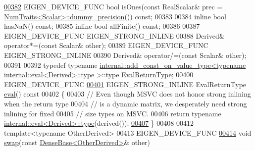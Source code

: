 \begin{DoxyCode}
\hyperlink{group___core___module_a8594e26025b86a531561a2476400eed1}{00382}     EIGEN\_DEVICE\_FUNC \textcolor{keywordtype}{bool} isOnes(\textcolor{keyword}{const} RealScalar& prec = 
      \hyperlink{group___core___module_struct_eigen_1_1_num_traits}{NumTraits<Scalar>::dummy\_precision}()) \textcolor{keyword}{const};
00383     
00384     \textcolor{keyword}{inline} \textcolor{keywordtype}{bool} hasNaN() \textcolor{keyword}{const};
00385     \textcolor{keyword}{inline} \textcolor{keywordtype}{bool} allFinite() \textcolor{keyword}{const};
00386 
00387     EIGEN\_DEVICE\_FUNC EIGEN\_STRONG\_INLINE
00388     Derived& operator*=(\textcolor{keyword}{const} Scalar& other);
00389     EIGEN\_DEVICE\_FUNC EIGEN\_STRONG\_INLINE
00390     Derived& operator/=(\textcolor{keyword}{const} Scalar& other);
00391 
00392     \textcolor{keyword}{typedef} \textcolor{keyword}{typename} 
      \hyperlink{struct_eigen_1_1internal_1_1add__const__on__value__type}{internal::add\_const\_on\_value\_type<typename internal::eval<Derived>::type}
      >::type \hyperlink{group___sparse_core___module}{EvalReturnType};
00400     EIGEN\_DEVICE\_FUNC
\hyperlink{group___core___module_a5df64c66228ba75bbc66db2584185527}{00401}     EIGEN\_STRONG\_INLINE EvalReturnType \hyperlink{group___core___module_a5df64c66228ba75bbc66db2584185527}{eval}()\textcolor{keyword}{ const}
00402 \textcolor{keyword}{    }\{
00403       \textcolor{comment}{// Even though MSVC does not honor strong inlining when the return type}
00404       \textcolor{comment}{// is a dynamic matrix, we desperately need strong inlining for fixed}
00405       \textcolor{comment}{// size types on MSVC.}
00406       \textcolor{keywordflow}{return} \textcolor{keyword}{typename} \hyperlink{struct_eigen_1_1internal_1_1eval}{internal::eval<Derived>::type}(derived());
\hyperlink{group___core___module_a4ce80c44ce2092f18ddecdaaac71b3d0}{00407}     \}
00408     
00412     \textcolor{keyword}{template}<\textcolor{keyword}{typename} OtherDerived>
00413     EIGEN\_DEVICE\_FUNC
\hyperlink{group___core___module_ab420d9d588ac443f5a1b1a7dceb12c90}{00414}     \textcolor{keywordtype}{void} \hyperlink{group___core___module_ab420d9d588ac443f5a1b1a7dceb12c90}{swap}(\textcolor{keyword}{const} \hyperlink{group___core___module_class_eigen_1_1_dense_base}{DenseBase<OtherDerived>}& other)

\end{DoxyCode}
